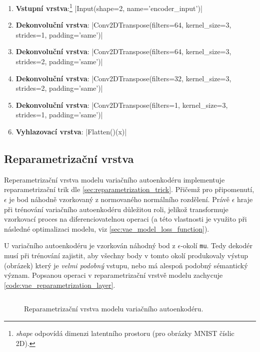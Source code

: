\begin{enumerate}
    \item \textbf{Vstupní vrstva}:\footnote{\emph{shape} odpovídá dimenzi latentního prostoru (pro obrázky MNIST číslic 2D).} |Input(shape=2, name='encoder_input')|
    \item \textbf{Dekonvoluční vrstva}: |Conv2DTranspose(filters=64, kernel_size=3, strides=1, padding='same')|
    \item \textbf{Dekonvoluční vrstva}: |Conv2DTranspose(filters=64, kernel_size=3, strides=2, padding='same')|
    \item \textbf{Dekonvoluční vrstva}: |Conv2DTranspose(filters=32, kernel_size=3, strides=2, padding='same')|
    \item \textbf{Dekonvoluční vrstva}: |Conv2DTranspose(filters=1, kernel_size=3, strides=1, padding='same')|
    \item \textbf{Vyhlazovací vrstva}: |Flatten()(x)|
\end{enumerate}

\subsection{Reparametrizační vrstva}
\label{sec:vae_model_reparametrization_layer}
Reperametrizační vrstva modelu variačního autoenkodéru implementuje reparametrizační trik dle \autoref{sec:reparametrization_trick}.
Přičemž pro připomenutí, $\epsilon$ je bod náhodně vzorkovaný z normovaného normálního rozdělení.
Právě $\epsilon$ hraje při trénování variačního autoenkodéru důležitou roli, jelikož transformuje vzorkovací proces na diferenciovatelnou operaci (a této vlastnosti je využito při následné optimalizaci modelu, viz \autoref{sec:vae_model_loss_function}).


U variačního autoenkodéru je vzorkován náhodný bod z $\epsilon$-okolí \lstinline{mu}.
Tedy dekodér musí při trénování zajistit, aby všechny body v tomto okolí produkovaly výstup (obrázek) který je \emph{velmi podobný} vstupu, nebo má alespoň podobný sémantický význam.
Popsanou operaci v reparametrizační vrstvě modelu zachycuje \autoref{code:vae_reparametrization_layer}.

\begin{figure}[H]
    \inputminted[linenos]{python}{code_snippets/vae_reparametrization.py}
    \caption{Reparametrizační vrstva modelu variačního autoenkodéru.}
    \label{code:vae_reparametrization_layer}
\end{figure}

